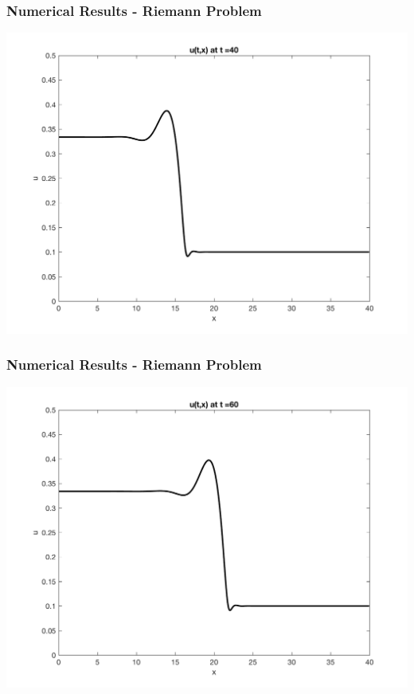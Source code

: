 \documentclass[10pt]{beamer}
\begin{document}
    \begin{frame}
      \frametitle{Numerical Results - Riemann Problem}
      \begin{center}
        \includegraphics[scale=0.5]{Figures/reimann40.png}
      \end{center}
    \end{frame}
    \begin{frame}
      \frametitle{Numerical Results - Riemann Problem}
      \begin{center}
        \includegraphics[scale=0.5]{Figures/reimann60.png}
      \end{center}
    \end{frame}
\end{document}
